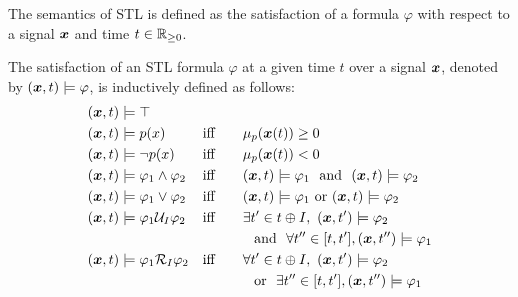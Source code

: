     The semantics of STL is defined as the satisfaction of a formula $\varphi$ with respect to a signal $\bm{x}$ and time $t \in \mathbb{R}_{\ge 0}$. 
        
        \begin{definition}
        \label{def:STL Semantics}
        The satisfaction of an STL formula $\varphi$ at a given time $t$ over a signal $\bm{x}$, denoted by $(\bm{x}, t) \models \varphi$, is inductively defined as follows:
            \begin{align*}
                &(\signal, t) \models \top & & \\
                &(\signal, t) \models p(x) & &\tiff\quad \mu_p(\signal(t)) \ge 0\\
                &(\signal, t) \models \neg p(x) & &\tiff\quad \mu_p(\signal(t)) < 0\\
                &(\signal, t) \models \varphi_1 \land \varphi_2& & \tiff\quad  (\signal, t) \models \varphi_1 \aand (\signal, t) \models \varphi_2\\
                &(\signal, t) \models \varphi_1 \lor \varphi_2& & \tiff\quad  (\signal, t) \models \varphi_1 \text{ or } (\signal, t) \models \varphi_2\\
                &(\signal , t) \models \varphi_1 \until_I \varphi_2& & \tiff\quad \exists t' \in t \oplus I,~ (\signal, t') \models \varphi_2\\ 
                & && \qquad\quad\aand\forall t'' \in [t, t'], (\signal, t'') \models \varphi_1\\
                & (\signal, t) \models \varphi_1 \release_I \varphi_2& & \tiff\quad \forall t'\in t \oplus I,~ (\signal, t') \models \varphi_2\\
                & && \qquad\quad\oor \exists t''\in[t,t'], (\signal,t'')\models \varphi_1
            \end{align*} 
        \end{definition}
